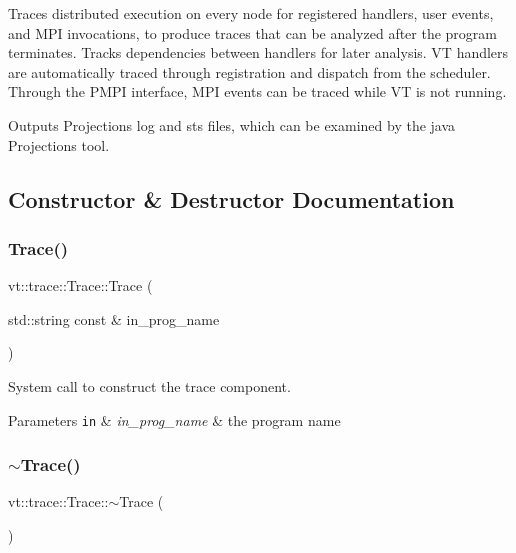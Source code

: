 Traces distributed execution on every node for registered handlers, user events, and M\+PI invocations, to produce traces that can be analyzed after the program terminates. Tracks dependencies between handlers for later analysis. VT handlers are automatically traced through registration and dispatch from the scheduler. Through the P\+M\+PI interface, M\+PI events can be traced while VT is not running.

Outputs Projections log and sts files, which can be examined by the java Projections tool. 

\subsection{Constructor \& Destructor Documentation}
\mbox{\label{structvt_1_1trace_1_1_trace_a2b736f560ee446cbd84aaf96e25c8d0b}} 
\subsubsection{\texorpdfstring{Trace()}{Trace()}}
{\footnotesize\ttfamily vt\+::trace\+::\+Trace\+::\+Trace (\begin{DoxyParamCaption}\item[{std\+::string const \&}]{in\+\_\+prog\+\_\+name }\end{DoxyParamCaption})}



System call to construct the trace component. 


\begin{DoxyParams}[1]{Parameters}
\mbox{\tt in}  & {\em in\+\_\+prog\+\_\+name} & the program name \\
\hline
\end{DoxyParams}
\mbox{\label{structvt_1_1trace_1_1_trace_a80b3426aed07572525ef4834b0c4dedd}} 
\subsubsection{\texorpdfstring{$\sim$\+Trace()}{~Trace()}}
{\footnotesize\ttfamily vt\+::trace\+::\+Trace\+::$\sim$\+Trace (\begin{DoxyParamCaption}{ }\end{DoxyParamCaption})\hspace{0.3cm}{\ttfamily [virtual]}}



